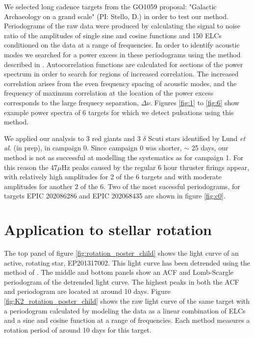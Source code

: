 \documentclass[useAMS, usenatbib]{aastex}
\begin{document}
We selected long cadence targets from the GO1059 proposal: "Galactic
Archaeology on a grand scale" (PI: Stello, D.) in order to test our method.
Periodograms of the raw data were produced by calculating the signal to noise
ratio of the amplitudes of single sine and cosine functions and 150 ELCs
conditioned on the data at a range of frequencies.
In order to identify acoustic modes we searched for a power excess in these
periodograms using the method described in \citet{Huber2009}.
Autocorrelation functions are calculated for sections of the power spectrum in
order to search for regions of increased correlation.
The increased correlation arises from the even frequency spacing of acoustic
modes, and the frequency of maximum correlation at the location of the power
excess corresponds to the large frequecy separation, $\Delta\nu$.
Figures \ref{fig:1} to \ref{fig:6} show example power spectra of 6 targets for
which we detect pulsations using this method.


We applied our analysis to 3 red giants and 3 $\delta$ Scuti stars
identified by Lund {\it et al.} (in prep), in campaign 0.
Since campaign 0 was shorter, $\sim$ 25 days, our method is not as successful
at modelling the systematics as for campaign 1.
For this reason the 47$\mu$Hz peaks caused by the regular 6 hour thruster
firings appear, with relatively high amplitudes for 2 of the 6 targets and with
moderate amplitudes for another 2 of the 6.
Two of the most sucessful periodograms, for targets EPIC 202086286 and EPIC
202068435 are shown in figure \ref{fig:c0}.

\section{Application to stellar rotation}
The top panel of figure \ref{fig:rotation_poster_child} shows the light curve
of an active, rotating star, EP201317002.
This light curve has been detrended using the method of
\citet{Vanderburg2014}.
The middle and bottom panels show an ACF and Lomb-Scargle periodogram of the
detrended light curve.
The highest peaks in both the ACF and periodogram are located at around 10
days.
Figure \ref{fig:K2_rotation_poster_child} shows the raw light curve of the same
target with a periodogram calculated by modeling the data as a linear
combination of ELCs and a sine and cosine function at a range of
frequencies.
Each method measures a rotation period of around 10 days for this target.
\end{document}

